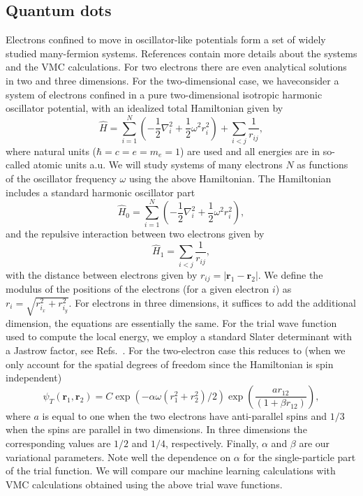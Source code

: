 \documentclass[twoside,english]{uiofysmaster}
\begin{document}
\subsection{Quantum dots}
Electrons confined to move in oscillator-like potentials form a set of
widely studied many-fermion systems.  References
\cite{Ledum2017,Mariadason2018} contain more details about
the systems and the VMC calculations.  For two electrons there are
even analytical solutions in two and three dimensions. For the
two-dimensional case, we haveconsider a system of electrons confined
in a pure two-dimensional isotropic harmonic oscillator potential,
with an idealized total Hamiltonian given by
\begin{equation}
\label{eq:finalH}
\hat{H}=\sum_{i=1}^{N} \left(  -\frac{1}{2} \nabla_i^2 + \frac{1}{2} \omega^2r_i^2  \right)+\sum_{i<j}\frac{1}{r_{ij}},
\end{equation}
where natural units ($\hbar=c=e=m_e=1$) are used and all energies are
in so-called atomic units a.u. We will study systems of many electrons
$N$ as functions of the oscillator frequency $\omega$ using the above
Hamiltonian.  The Hamiltonian includes a standard harmonic oscillator
part
\begin{equation*}
\hat{H}_0=\sum_{i=1}^{N} \left(  -\frac{1}{2} \nabla_i^2 + \frac{1}{2} \omega^2r_i^2  \right),
\end{equation*}
and the repulsive interaction between two electrons given by
\begin{equation*}
\hat{H}_1=\sum_{i<j}\frac{1}{r_{ij}},
\end{equation*}
with the distance between electrons given by $r_{ij}=\vert \bm{r}_1-\bm{r}_2\vert$. We define the 
modulus of the positions of the electrons (for a given electron $i$) as $r_i = \sqrt{r_{i_x}^2+r_{i_y}^2}$.
For electrons in three dimensions, it suffices to add the additional dimension, the equations are essentially the same. For the trial wave function used to compute the local energy, we employ a standard Slater determinant 
with a Jastrow factor, see Refs.~\cite{Ledum2017,Mariadason2018}. For the two-electron case this reduces to (when we only account for the spatial degrees of freedom since the Hamiltonian is spin independent)
\begin{equation}
   \psi_{T}(\bm{r}_1,\bm{r}_2) = 
   C\exp{\left(-\alpha\omega(r_1^2+r_2^2)/2\right)}
   \exp{\left(\frac{ar_{12}}{(1+\beta r_{12})}\right)}, 
\label{eq:trial}
\end{equation}
where $a$ is equal to one when the two electrons have
anti-parallel spins and $1/3$ when the spins are parallel in two dimensions. In three dimensions the corresponding values are $1/2$ and $1/4$, respectively. Finally,
$\alpha$ and $\beta$ are our variational parameters. Note well the
dependence on $\alpha$ for the single-particle part of the trial
function. We will compare our machine learning calculations with VMC calculations obtained using the above trial wave functions.
\end{document}
